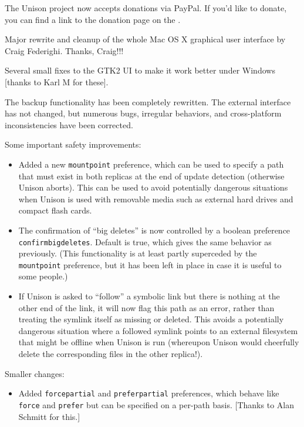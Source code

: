 \begin{changesfromversion}{2.17}
\item The Unison project now accepts donations via PayPal.  If you'd like to
donate, you can find a link to the donation page on the
.

\item Major rewrite and cleanup of the whole Mac OS X graphical user
interface by Craig Federighi.  Thanks, Craig!!!

\item Several small fixes to the GTK2 UI to make it work better under
Windows [thanks to Karl M for these].

\item The backup functionality has been completely rewritten.  The external
interface has not changed, but numerous bugs, irregular behaviors, and
cross-platform inconsistencies have been corrected.

\item Some important safety improvements:
\begin{itemize}
\item Added a new \verb|mountpoint| preference, which can be used to specify
a path that must exist in both replicas at the end of update detection
(otherwise Unison aborts).  This can be used to avoid potentially dangerous
situations when Unison is used with removable media such as external hard
drives and compact flash cards.  

\item The confirmation of ``big deletes'' is now controlled by a boolean preference
  \verb|confirmbigdeletes|.  Default is true, which gives the same behavior as
  previously.  (This functionality is at least partly superceded by the
  \verb|mountpoint| preference, but it has been left in place in case it is
  useful to some people.)
  
  \item If Unison is asked to ``follow'' a symbolic link but there is
  nothing at the other end of the link, it will now flag this path as an
  error, rather than treating the symlink itself as missing or deleted.
  This avoids a potentially dangerous situation where a followed symlink
  points to an external filesystem that might be offline when Unison is run
  (whereupon Unison would cheerfully delete the corresponding files in the
  other replica!).
\end{itemize}

\item Smaller changes:
\begin{itemize}
\item Added \verb|forcepartial| and \verb|preferpartial| preferences, which
behave like \verb|force| and \verb|prefer| but can be specified on a
per-path basis. [Thanks to Alan Schmitt for this.]


\end{itemize}
\end{changesfromversion}
